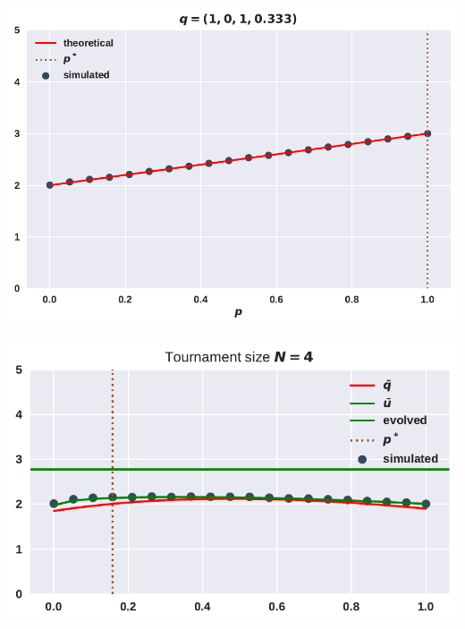 \documentclass[usenames,dvipsnames,t]{beamer}
\begin{document}
\begin{columns}
\begin{column}{.2\linewidth}
\begin{center}
            \includegraphics[width=.65\textwidth]{static/plot_four}
            \vspace{.2cm}

            \includegraphics[width=.65\textwidth, height=.45\textwidth]{static/tournament}
        \end{center}
    \end{column}
\end{columns}

\end{document}
